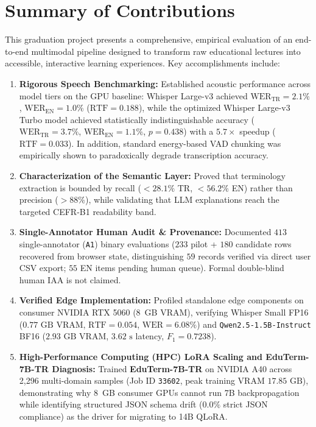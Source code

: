 \documentclass[a4paper,12pt]{report}
\begin{document}
\section{Summary of Contributions}
This graduation project presents a comprehensive, empirical evaluation of an end-to-end multimodal pipeline designed to transform raw educational lectures into accessible, interactive learning experiences. Key accomplishments include:
\begin{enumerate}
    \item \textbf{Rigorous Speech Benchmarking:} Established acoustic performance across model tiers on the GPU baseline: Whisper Large-v3 achieved $\text{WER}_{\text{TR}} = 2.1\%$, $\text{WER}_{\text{EN}} = 1.0\%$ ($\text{RTF} = 0.188$), while the optimized Whisper Large-v3 Turbo model achieved statistically indistinguishable accuracy ($\text{WER}_{\text{TR}} = 3.7\%$, $\text{WER}_{\text{EN}} = 1.1\%$, $p=0.438$) with a $5.7\times$ speedup ($\text{RTF} = 0.033$). In addition, standard energy-based VAD chunking was empirically shown to paradoxically degrade transcription accuracy.
    \item \textbf{Characterization of the Semantic Layer:} Proved that terminology extraction is bounded by recall ($<28.1\%$ TR, $<56.2\%$ EN) rather than precision ($>88\%$), while validating that LLM explanations reach the targeted CEFR-B1 readability band.
    \item \textbf{Single-Annotator Human Audit \& Provenance:} Documented $413$ single-annotator (\texttt{A1}) binary evaluations ($233$ pilot + $180$ candidate rows recovered from browser state, distinguishing $59$ records verified via direct user CSV export; $55$ EN items pending human queue). Formal double-blind human IAA is not claimed.
    \item \textbf{Verified Edge Implementation:} Profiled standalone edge components on consumer NVIDIA RTX 5060 (8~GB VRAM), verifying Whisper Small FP16 ($0.77\text{ GB}$ VRAM, $\text{RTF}=0.054$, $\text{WER}=6.08\%$) and \texttt{Qwen2.5-1.5B-Instruct} BF16 ($2.93\text{ GB}$ VRAM, $3.62\text{ s}$ latency, $F_1=0.7238$).
    \item \textbf{High-Performance Computing (HPC) LoRA Scaling and EduTerm-7B-TR Diagnosis:} Trained \textbf{EduTerm-7B-TR} on NVIDIA A40 across 2,296 multi-domain samples (Job ID \texttt{33602}, peak training VRAM $17.85\text{ GB}$), demonstrating why 8~GB consumer GPUs cannot run 7B backpropagation while identifying structured JSON schema drift ($0.0\%$ strict JSON compliance) as the driver for migrating to 14B QLoRA.

\end{enumerate}
\end{document}
